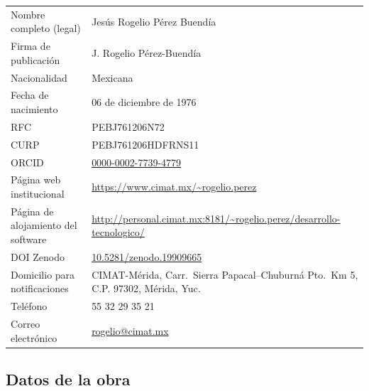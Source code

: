 \documentclass[11pt,a4paper,oneside]{article}
\theoremstyle{plain}
\theoremstyle{definition}
\theoremstyle{remark}
\begin{document}
\begin{tabularx}{\linewidth}{lX}
  \toprule
  Nombre completo (legal) & Jesús Rogelio Pérez Buendía \\
  Firma de publicación    & J. Rogelio Pérez-Buendía \\
  Nacionalidad            & Mexicana \\
  Fecha de nacimiento     & 06 de diciembre de 1976 \\
  RFC                     & PEBJ761206N72 \\
  CURP                    & PEBJ761206HDFRNS11 \\
  ORCID                   & \href{https://orcid.org/0000-0002-7739-4779}{0000-0002-7739-4779} \\
  Página web institucional& \url{https://www.cimat.mx/~rogelio.perez} \\
  Página de alojamiento del software & \url{http://personal.cimat.mx:8181/~rogelio.perez/desarrollo-tecnologico/} \\
  DOI Zenodo              & \href{https://doi.org/10.5281/zenodo.19909665}{10.5281/zenodo.19909665} \\
  Domicilio para notificaciones & CIMAT-Mérida, Carr.\ Sierra Papacal--Chuburná Pto.\ Km 5, C.P. 97302, Mérida, Yuc. \\
  Teléfono                & 55 32 29 35 21 \\
  Correo electrónico      & \href{mailto:rogelio@cimat.mx}{rogelio@cimat.mx} \\
  \bottomrule
\end{tabularx}

\subsection{Datos de la obra}
\end{document}
